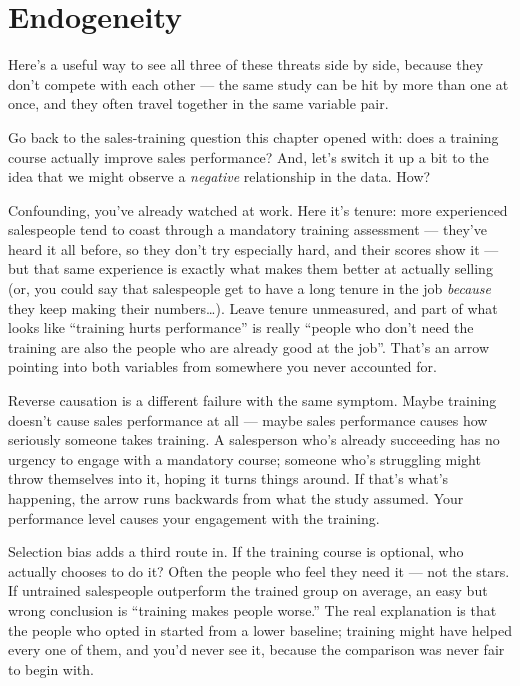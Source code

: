 \documentclass[
]{book}
\begin{document}
\section{Endogeneity}\label{endogeneity}

Here's a useful way to see all three of these threats side by side, because they don't compete with each other --- the same study can be hit by more than one at once, and they often travel together in the same variable pair.

Go back to the sales-training question this chapter opened with: does a training course actually improve sales performance? And, let's switch it up a bit to the idea that we might observe a \emph{negative} relationship in the data. How?

Confounding, you've already watched at work. Here it's tenure: more experienced salespeople tend to coast through a mandatory training assessment --- they've heard it all before, so they don't try especially hard, and their scores show it --- but that same experience is exactly what makes them better at actually selling (or, you could say that salespeople get to have a long tenure in the job \emph{because} they keep making their numbers\ldots). Leave tenure unmeasured, and part of what looks like ``training hurts performance'' is really ``people who don't need the training are also the people who are already good at the job''. That's an arrow pointing into both variables from somewhere you never accounted for.

Reverse causation is a different failure with the same symptom. Maybe training doesn't cause sales performance at all --- maybe sales performance causes how seriously someone takes training. A salesperson who's already succeeding has no urgency to engage with a mandatory course; someone who's struggling might throw themselves into it, hoping it turns things around. If that's what's happening, the arrow runs backwards from what the study assumed. Your performance level causes your engagement with the training.

Selection bias adds a third route in. If the training course is optional, who actually chooses to do it? Often the people who feel they need it --- not the stars. If untrained salespeople outperform the trained group on average, an easy but wrong conclusion is ``training makes people worse.'' The real explanation is that the people who opted in started from a lower baseline; training might have helped every one of them, and you'd never see it, because the comparison was never fair to begin with.
\end{document}
